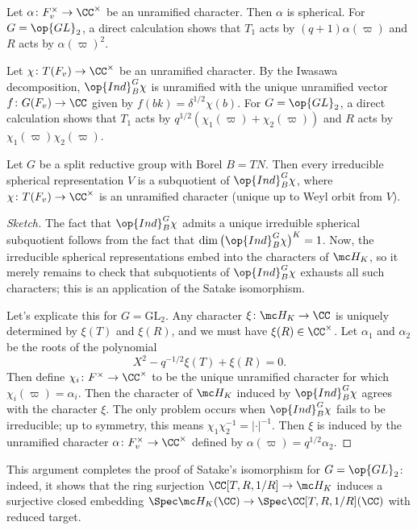 \documentclass{article}
\begin{document}
\begin{example}
	Let $\alpha\colon F_v^\times\to\CC^\times$ be an unramified character. Then $\alpha$ is spherical. For $G=\op{GL}_2$, a direct calculation shows that $T_1$ acts by $(q+1)\alpha(\varpi)$ and $R$ acts by $\alpha(\varpi)^2$.
\end{example}
\begin{example}
	Let $\chi\colon T(F_v)\to\CC^\times$ be an unramified character. By the Iwasawa decomposition, $\op{Ind}_B^G\chi$ is unramified with the unique unramified vector $f\colon G(F_v)\to\CC$ given by $f(bk)=\delta^{1/2}\chi(b)$. For $G=\op{GL}_2$, a direct calculation shows that $T_1$ acts by $q^{1/2}(\chi_1(\varpi)+\chi_2(\varpi))$ and $R$ acts by $\chi_1(\varpi)\chi_2(\varpi)$.
\end{example}
\begin{theorem}
	Let $G$ be a split reductive group with Borel $B=TN$. Then every irreducible spherical representation $V$ is a subquotient of $\op{Ind}_B^G\chi$, where $\chi\colon T(F_v)\to\CC^\times$ is an unramified character (unique up to Weyl orbit from $V$).
\end{theorem}
\begin{proof}[Sketch]
	The fact that $\op{Ind}_B^G\chi$ admits a unique irreduible spherical subquotient follows from the fact that $\dim\big(\op{Ind}_B^G\chi\big)^K=1$. Now, the irreducible spherical representations embed into the characters of $\mc H_K$, so it merely remains to check that subquotients of $\op{Ind}_B^G\chi$ exhausts all such characters; this is an application of the Satake isomorphism.

	Let's explicate this for $G=\mathrm{GL}_2$. Any character $\xi\colon\mc H_K\to\CC$ is uniquely determined by $\xi(T)$ and $\xi(R)$, and we must have $\xi(R)\in\CC^\times$. Let $\alpha_1$ and $\alpha_2$ be the roots of the polynomial
	\[X^2-q^{-1/2}\xi(T)+\xi(R)=0.\]
	Then define $\chi_i\colon F^\times\to\CC^\times$ to be the unique unramified character for which $\chi_i(\varpi)=\alpha_i$. Then the character of $\mc H_K$ induced by $\op{Ind}_B^G\chi$ agrees with the character $\xi$. The only problem occurs when $\op{Ind}_B^G\chi$ fails to be irreducible; up to symmetry, this means $\chi_1\chi_2^{-1}=\left|\cdot\right|^{-1}$. Then $\xi$ is induced by the unramified character $\alpha\colon F_v^\times\to\CC^\times$ defined by $\alpha(\varpi)=q^{1/2}\alpha_2$.
\end{proof}
\begin{remark}
	This argument completes the proof of Satake's isomorphism for $G=\op{GL}_2$: indeed, it shows that the ring surjection $\CC[T,R,1/R]\to\mc H_K$ induces a surjective closed embedding $\Spec\mc H_K(\CC)\to\Spec\CC[T,R,1/R](\CC)$ with reduced target.
\end{remark}
\end{document}
